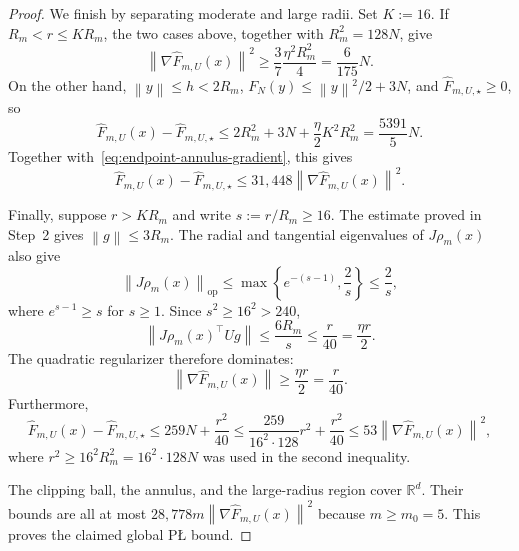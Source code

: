 \documentclass[11pt]{article}
\newcommand{\R}{\mathbb{R}}
\newcommand{\norm}[1]{\left\lVert #1\right\rVert}
\begin{document}
\begin{proof}
We finish by separating moderate and large radii. Set $K:=16$. If $R_m<r\le KR_m$, the two cases above, together
with $R_m^2=128N$, give
\begin{equation}
\label{eq:endpoint-annulus-gradient}
\norm{\nabla\widehat F_{m,U}(x)}^2
\ge
\frac{3}{7}\frac{\eta^2R_m^2}{4}
=\frac{6}{175}N.
\end{equation}
On the other hand, $\norm{y}\le h<2R_m$, $F_N(y)\le\norm{y}^2/2+3N$, and
$\widehat F_{m,U,\star}\ge0$, so
\[
\widehat F_{m,U}(x)-\widehat F_{m,U,\star}
\le
2R_m^2+3N+\frac{\eta}{2}K^2R_m^2
=\frac{5391}{5}N.
\]
Together with~\eqref{eq:endpoint-annulus-gradient}, this gives
\[
\widehat F_{m,U}(x)-\widehat F_{m,U,\star}
\le
31{,}448\norm{\nabla\widehat F_{m,U}(x)}^2.
\]

Finally, suppose $r>KR_m$ and write $s:=r/R_m\ge16$. The estimate proved in Step~2 gives
$\norm{g}\le3R_m$. The radial and tangential eigenvalues of
$J\rho_m(x)$ also give
\[
\norm{J\rho_m(x)}_{\mathrm{op}}
\le
\max\left\{e^{-(s-1)},\frac{2}{s}\right\}
\le\frac{2}{s},
\]
where $e^{s-1}\ge s$ for $s\ge1$. Since $s^2\ge16^2>240$,
\[
\norm{J\rho_m(x)^\top Ug}
\le
\frac{6R_m}{s}
\le
\frac{r}{40}
=\frac{\eta r}{2}.
\]
The quadratic regularizer therefore dominates:
\[
\norm{\nabla\widehat F_{m,U}(x)}\ge\frac{\eta r}{2}=\frac{r}{40}.
\]
Furthermore,
\[
\widehat F_{m,U}(x)-\widehat F_{m,U,\star}
\le259N+\frac{r^2}{40}
\le\frac{259}{16^2\cdot128}r^2+\frac{r^2}{40}
\le53\norm{\nabla\widehat F_{m,U}(x)}^2,
\]
where $r^2\ge16^2R_m^2=16^2\cdot128N$ was used in the second inequality.

The clipping ball, the annulus, and the large-radius region cover $\R^d$. Their bounds are all at most
$28{,}778m\norm{\nabla\widehat F_{m,U}(x)}^2$ because $m\ge m_0=5$. This proves the claimed global P\L{} bound.
\end{proof}
\endgroup
\end{document}
